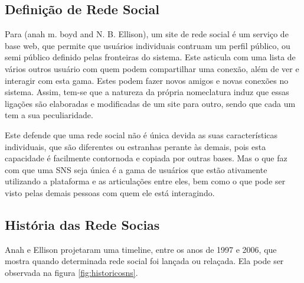 \subsection{Definição de Rede Social}


\label{sec:definicao}
Para (anah m. boyd and N. B. Ellison), um site de rede social é um serviço
de base web, que permite que usuários individuais contruam um perfil público, ou
semi público definido pelas fronteiras do sistema. Este asticula com uma lista de
vários outros usuário com quem podem compartilhar uma conexão, além de ver e
interagir com esta gama. Estes podem fazer novos amigos e novas conexões no sistema.
Assim, tem-se que a natureza da própria nomeclatura induz que essas ligações
são elaboradas e modificadas de um site para outro, sendo que cada um tem a sua
peculiaridade.

Este defende que uma rede social não é única devida as suas características individuais,
que são diferentes ou estranhas perante às demais, pois esta capacidade é facilmente
contornoda e copiada por outras bases. Mas o que faz com que uma SNS seja única
é a gama de usuários que estão ativamente utilizando a plataforma e as articulações
entre eles, bem como o que pode ser visto pelas demais pessoas com quem ele está
interagindo.

\subsection{História das Rede Socias}
\label{sec:historiadasredessociais}
Anah e Ellison projetaram uma timeline, entre os anos de 1997 e 2006, que mostra
quando determinada rede social foi lançada ou relaçada. Ela pode ser observada
na figura \ref{fig:historicosns}.

